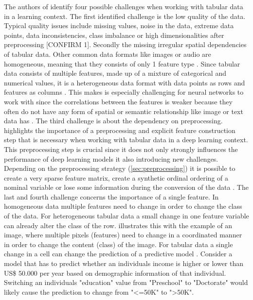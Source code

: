 The authors of \cite{borisov2022DeepNeuralNetworks} identify four possible challenges when working with tabular data in a learning context.
The first identified challenge is the low quality of the data. Typical quality issues include missing values, noise in the data, extreme data points, data inconsistencies, class imbalance or high dimensionalities after preprocessing \cite{borisov2022DeepNeuralNetworks}[CONFIRM 1].
Secondly the missing irregular spatial dependencies of tabular data. Other common data formats like images or audio are homogeneous, 
meaning that they consists of only 1 feature type \cite{borisov2022DeepNeuralNetworks}.
Since tabular data consists of multiple features, made up of a mixture of categorical and numerical values, it is a heterogeneous data format with data points as rows and features as columns \cite{borisov2022DeepNeuralNetworks}.
This makes is especially challenging for neural networks to work with since the correlations between the features is weaker because they often do not have any form of spatial or semantic relationship like image or text data has \cite{borisov2022DeepNeuralNetworks, yoon2020VIMEExtendingSuccess}.
The third challenge is about the dependency on preprocessing. \cite{borisov2022DeepNeuralNetworks} highlights the importance of a preprocessing and explicit feature construction step that is necessary when working with tabular data in a deep learning context.
This preprocessing step is crucial since it does not only strongly influences the performance of deep learning \glspl{model} \cite{gorishniy2022EmbeddingsNumericalFeatures} 
it also introducing new challenges. Depending on the preprocessing strategy (\autoref{sec:preprocessing}) it is possible to create a very sparse feature matrix, create a synthetic ordinal ordering of a nominal variable or lose some information during the conversion of the data \cite{borisov2022DeepNeuralNetworks}.
The last and fourth challenge concerns the importance of a single feature. In homogeneous data multiple features need to change in order to change the class of the data. 
For heterogeneous tabular data a small change in one feature variable can already alter the class of the row. 
\cite{borisov2022DeepNeuralNetworks} illustrates this with the example of an image, where multiple pixels (\ie features) need to change in a coordinated manner in order to change the content (\ie class) of the image.
For tabular data a single change in a cell can change the prediction of a predictive \gls{model} \cite{borisov2022DeepNeuralNetworks}. 
Consider a \gls{model} that has to predict whether an individuals income is higher or lower than US\$ 50.000 per year \cite{Dua:2019} based on demographic information of that individual.
Switching an individuals "education" value from "Preschool" to "Doctorate" would likely cause the prediction to change from "<=50K" to ">50K".



